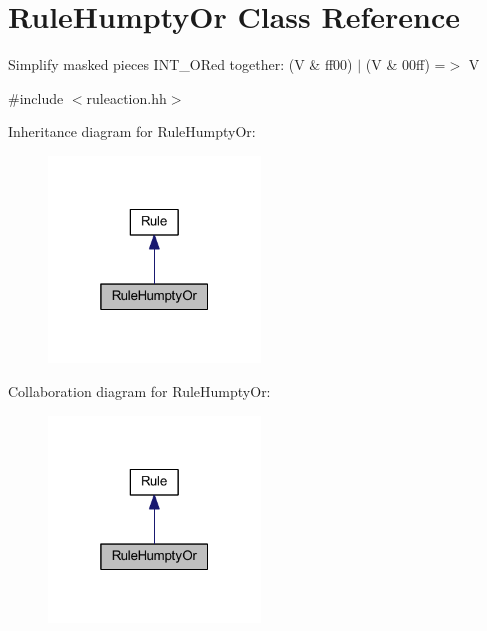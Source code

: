 \hypertarget{class_rule_humpty_or}{}\section{Rule\+Humpty\+Or Class Reference}
\label{class_rule_humpty_or}


Simplify masked pieces I\+N\+T\+\_\+\+O\+Red together\+: {\ttfamily (V \& ff00) $\vert$ (V \& 00ff) =$>$ V}  




{\ttfamily \#include $<$ruleaction.\+hh$>$}



Inheritance diagram for Rule\+Humpty\+Or\+:
\nopagebreak
\begin{figure}[H]
\begin{center}
\leavevmode
\includegraphics[width=160pt]{class_rule_humpty_or__inherit__graph}
\end{center}
\end{figure}


Collaboration diagram for Rule\+Humpty\+Or\+:
\nopagebreak
\begin{figure}[H]
\begin{center}
\leavevmode
\includegraphics[width=160pt]{class_rule_humpty_or__coll__graph}
\end{center}
\end{figure}
